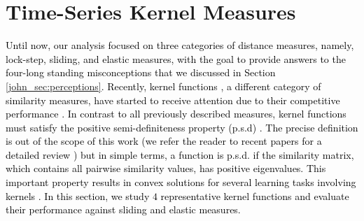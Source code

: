 \documentclass[11pt]{article}
\begin{document}
\vspace{-0.2cm}
\section{Time-Series Kernel Measures}
\label{john_sec:kernel}
\textcolor{black}{Until now, our analysis focused on three categories of distance measures, namely, lock-step, sliding, and elastic measures, with the goal to provide answers to the four-long standing misconceptions that we discussed in Section \ref{john_sec:perceptions}. Recently, kernel functions \cite{scholkopf1997kernel,scholkopf1998nonlinear}, a different category of similarity measures, have started to receive attention due to their competitive performance \cite{abanda2019review}. In contrast to all previously described measures, kernel functions must satisfy the positive semi-definiteness property (p.s.d) \cite{scholkopf2002learning}. The precise definition is out of the scope of this work (we refer the reader to recent papers for a detailed review \cite{abanda2019review,paparrizos2019grail}) but in simple terms, a function is p.s.d. if the similarity matrix, which contains all pairwise similarity values, has positive eigenvalues. This important property results in convex solutions for several learning tasks involving kernels \cite{cortes1995support}. In this section, we study $4$ representative kernel functions and evaluate their performance against sliding and elastic measures.}
\end{document}
